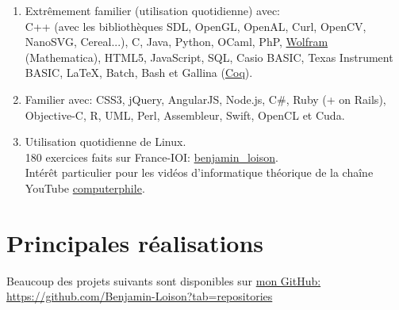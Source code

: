 \documentclass{article}
\begin{document}
		\begin{enumerate}

			\item Extrêmement familier (utilisation quotidienne) avec:\\
				C++ (avec les bibliothèques SDL, OpenGL, OpenAL, Curl, OpenCV, NanoSVG, Cereal...), C, Java, Python, OCaml, PhP, \href{https://www.wolfram.com/language/elementary-introduction/2nd-ed/}{Wolfram} (Mathematica), HTML5, JavaScript, SQL, Casio BASIC, Texas Instrument BASIC, \LaTeX, Batch, Bash et Gallina (\href{https://fr.wikipedia.org/wiki/Coq_(logiciel)}{Coq}).
			
			\item Familier avec: CSS3, jQuery, AngularJS, Node.js, C\#, Ruby (+ on Rails), Objective-C, R, UML, Perl, Assembleur, Swift, OpenCL et Cuda.
		
			\item Utilisation quotidienne de Linux.\\
			180 exercices faits sur France-IOI: \href{http://france-ioi.org/user/perso.php?sLogin=benjamin_loison}{benjamin\_loison}.\\
			Intérêt particulier pour les vidéos d'informatique théorique de la chaîne YouTube \href{https://www.youtube.com/user/Computerphile}{computerphile}.

		\end{enumerate}

		\section{Principales réalisations}

			Beaucoup des projets suivants sont disponibles sur \href{https://github.com/Benjamin-Loison?tab=repositories}{mon GitHub: https://github.com/Benjamin-Loison?tab=repositories}
\end{document}
